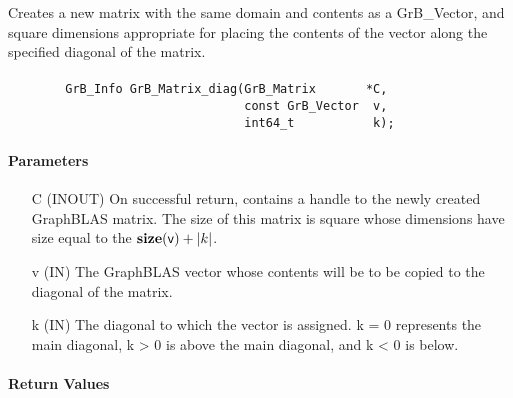 Creates a new matrix with the same domain and contents as a {\sf GrB\_Vector}, 
and square dimensions appropriate for placing the contents of the vector along the 
specified diagonal of the matrix.

\paragraph{\syntax}

\begin{verbatim}
        GrB_Info GrB_Matrix_diag(GrB_Matrix       *C,
                                 const GrB_Vector  v,
                                 int64_t           k);
\end{verbatim}

\paragraph{Parameters}

\begin{itemize}[leftmargin=1.1in]
    \item[{\sf C}] ({\sf INOUT}) On successful return, contains a handle to 
                                 the newly created GraphBLAS matrix.  The size of this
                                 matrix is square whose dimensions have size equal to
                                 the $\mathbf{size}({\sf v}) + |k|$.
    \item[{\sf v}] ({\sf IN})    The GraphBLAS vector whose contents will be
                                 to be copied to the diagonal of the matrix.
    \item[{\sf k}] ({\sf IN})    The diagonal to which the vector is assigned. {\sf k} = 0
                                 represents the main diagonal, {\sf k} > 0 is above the main 
                                 diagonal, and {\sf k} < 0 is below.
\end{itemize}


\paragraph{Return Values}

